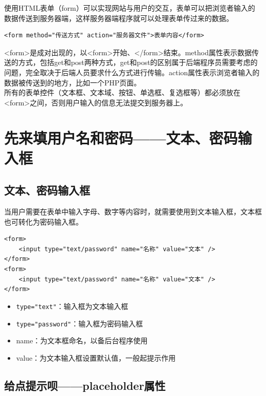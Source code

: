 使用HTML表单（form）可以实现网站与用户的交互，表单可以把浏览者输入的数据传送到服务器端，这样服务器端程序就可以处理表单传过来的数据。 \\

\begin{lstlisting}[style=htmlcssjs]
<form method="传送方式" action="服务器文件">表单内容</form>
\end{lstlisting}

<form>是成对出现的，以<form>开始、</form>结束。method属性表示数据传送的方式，包括get和post两种方式，get和post的区别属于后端程序员需要考虑的问题，完全取决于后端人员要求什么方式进行传输。action属性表示浏览者输入的数据被传送到的地方，比如一个PHP页面。 \\

所有的表单控件（文本框、文本域、按钮、单选框、复选框等）都必须放在<form>之间，否则用户输入的信息无法提交到服务器上。

\newpage

\section{先来填用户名和密码——文本、密码输入框}

\subsection{文本、密码输入框}

当用户需要在表单中输入字母、数字等内容时，就需要使用到文本输入框，文本框也可转化为密码输入框。 \\

\begin{lstlisting}[style=htmlcssjs]
<form>
    <input type="text/password" name="名称" value="文本" />
</form>
<form>
    <input type="text/password" name="名称" value="文本" />
</form>
\end{lstlisting}

\begin{itemize}
	\item \lstinline|type="text"|：输入框为文本输入框
	\item \lstinline|type="password"|：输入框为密码输入框
	\item name：为文本框命名，以备后台程序使用
	\item value：为文本输入框设置默认值，一般起提示作用
\end{itemize}

\subsection{给点提示呗——placeholder属性}

